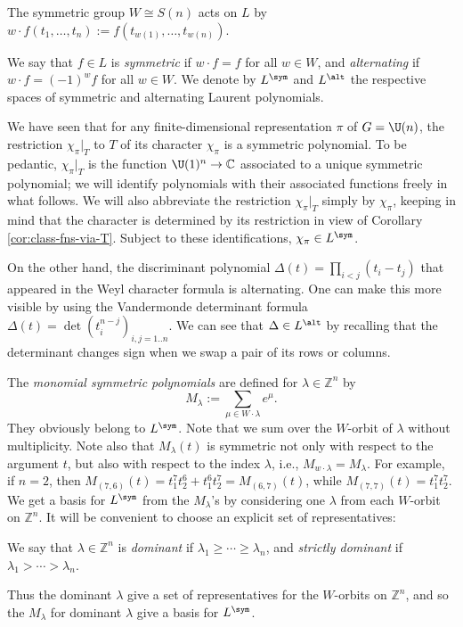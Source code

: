 \documentclass[reqno]{amsart} 
\begin{document}
The symmetric group $W \cong S(n)$ acts on $L$ by $w \cdot f(t_1,\dotsc,t_n) := f(t_{w(1)}, \dotsc, t_{w(n)})$.
\begin{definition}
  We say that $f \in L$ is \emph{symmetric} if $w \cdot f = f$ for all $w \in W$, and \emph{alternating} if $w \cdot f = (-1)^w f$ for all $w \in W$.  We denote by $L^{\sym}$ and $L^{\alt}$ the respective spaces of symmetric and alternating Laurent polynomials.
\end{definition}
We have seen that for any finite-dimensional representation $\pi$ of $G = \U(n)$, the restriction $\chi_\pi|_{T}$ to $T$ of its character $\chi_\pi$ is a symmetric polynomial.  To be pedantic, $\chi_\pi|_{T}$ is the function $\U(1)^n \rightarrow \mathbb{C}$ associated to a unique symmetric polynomial; we will identify polynomials with their associated functions freely in what follows.  We will also abbreviate the restriction $\chi_\pi|_{T}$ simply by $\chi_\pi$, keeping in mind that the character is determined by its restriction in view of Corollary \ref{cor:class-fns-via-T}.  Subject to these identifications, $\chi_\pi \in L^{\sym}$.

On the other hand, the discriminant polynomial $\Delta(t) = \prod_{i < j} (t_i - t_j)$ that appeared in the Weyl character formula is alternating.  One can make this more visible by using the Vandermonde determinant formula $\Delta(t) = \det(t_i^{n-j})_{i,j=1..n}$.  We can see that $\Delta \in L^{\alt}$ by recalling that the determinant changes sign when we swap a pair of its rows or columns.

The \emph{monomial symmetric polynomials} are defined for $\lambda \in \mathbb{Z}^n$ by
\begin{equation*}
M_{\lambda} := \sum_{\mu \in W \cdot \lambda} e^\mu.
\end{equation*}
 They obviously belong to $L^{\sym}$.  Note that we sum over the $W$-orbit of $\lambda$ without multiplicity.  Note also that $M_\lambda(t)$ is symmetric not only with respect to the argument $t$, but also with respect to the index $\lambda$, i.e., $M_{w \cdot \lambda} = M_\lambda$.  For example, if $n = 2$, then $M_{(7,6)}(t) = t_1^7 t_2^6 + t_1^6 t_2^7 = M_{(6,7)}(t)$, while $M_{(7,7)}(t) = t_1^7 t_2^7$.  We get a basis for $L^{\sym}$ from the $M_\lambda$'s by considering one $\lambda$ from each $W$-orbit on $\mathbb{Z}^n$.  It will be convenient to choose an explicit set of representatives:
\begin{definition}
  We say that $\lambda \in \mathbb{Z}^n$ is \emph{dominant} if $\lambda_1 \geq \dotsb \geq \lambda_n$, and \emph{strictly dominant} if $\lambda_1 > \dotsb > \lambda_n$.
\end{definition}
Thus the dominant $\lambda$ give a set of representatives for the $W$-orbits on $\mathbb{Z}^n$, and so the $M_\lambda$ for dominant $\lambda$ give a basis for $L^{\sym}$.
\end{document}
